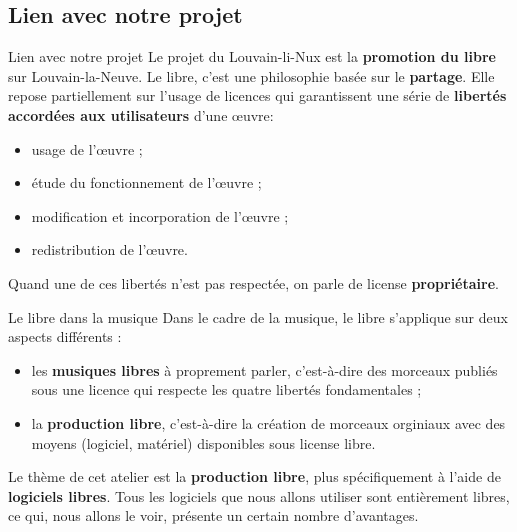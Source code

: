 \documentclass{beamer}
\begin{document}
\subsection{Lien avec notre projet}
\begin{frame}{Lien avec notre projet}
  Le projet du Louvain-li-Nux est la \textbf{promotion du libre} sur Louvain-la-Neuve. Le libre, c'est une philosophie basée sur le \textbf{partage}. Elle repose partiellement sur l'usage de licences qui garantissent une série de \textbf{libertés accordées aux utilisateurs} d'une \oe{}uvre\footnotemark :
  \begin{itemize}
  \item usage de l'\oe{}uvre ;
  \item étude du fonctionnement de l'\oe{}uvre ;
  \item modification et incorporation de l'\oe{}uvre ;
  \item redistribution de l'\oe{}uvre.
  \end{itemize}
  Quand une de ces libertés n'est pas respectée, on parle de license \textbf{propriétaire}.
\end{frame}

\begin{frame}{Le libre dans la musique}
  Dans le cadre de la musique, le libre s'applique sur deux aspects différents : 
  \begin{itemize}
  \item les \textbf{musiques libres} à proprement parler, c'est-à-dire des morceaux publiés sous une licence qui respecte les quatre libertés fondamentales ;
  \item la \textbf{production libre}, c'est-à-dire la création de morceaux orginiaux avec des moyens (logiciel, matériel) disponibles sous license libre.
  \end{itemize}
  Le thème de cet atelier est la \textbf{production libre}, plus spécifiquement à l'aide de \textbf{logiciels libres}. Tous les logiciels que nous allons utiliser sont entièrement libres, ce qui, nous allons le voir, présente un certain nombre d'avantages.
\end{frame}
\end{document}

